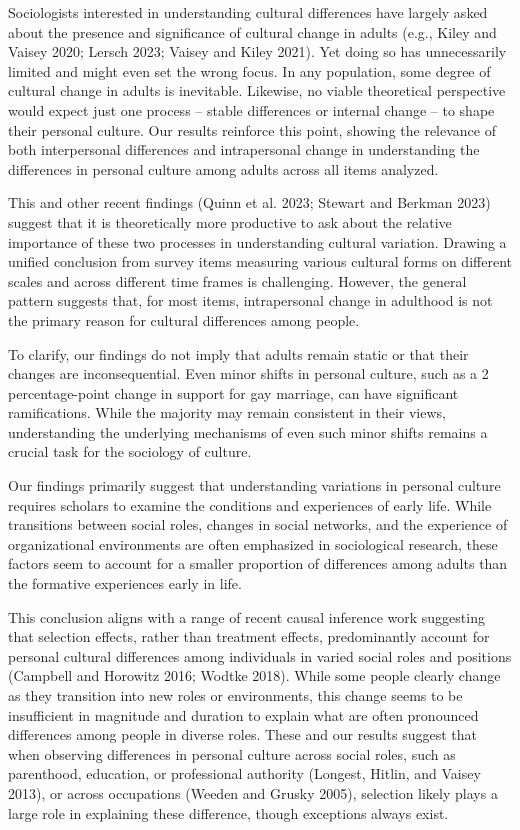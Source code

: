 \documentclass[
  12pt,
]{article}
\begin{document}
Sociologists interested in understanding cultural differences have
largely asked about the presence and significance of cultural change in
adults (e.g., Kiley and Vaisey 2020; Lersch 2023; Vaisey and Kiley
2021). Yet doing so has unnecessarily limited and might even set the
wrong focus. In any population, some degree of cultural change in adults
is inevitable. Likewise, no viable theoretical perspective would expect
just one process -- stable differences or internal change -- to shape
their personal culture. Our results reinforce this point, showing the
relevance of both interpersonal differences and intrapersonal change in
understanding the differences in personal culture among adults across
all items analyzed.

This and other recent findings (Quinn et al. 2023; Stewart and Berkman
2023) suggest that it is theoretically more productive to ask about the
relative importance of these two processes in understanding cultural
variation. Drawing a unified conclusion from survey items measuring
various cultural forms on different scales and across different time
frames is challenging. However, the general pattern suggests that, for
most items, intrapersonal change in adulthood is not the primary reason
for cultural differences among people.

To clarify, our findings do not imply that adults remain static or that
their changes are inconsequential. Even minor shifts in personal
culture, such as a 2 percentage-point change in support for gay
marriage, can have significant ramifications. While the majority may
remain consistent in their views, understanding the underlying
mechanisms of even such minor shifts remains a crucial task for the
sociology of culture.

Our findings primarily suggest that understanding variations in personal
culture requires scholars to examine the conditions and experiences of
early life. While transitions between social roles, changes in social
networks, and the experience of organizational environments are often
emphasized in sociological research, these factors seem to account for a
smaller proportion of differences among adults than the formative
experiences early in life.

This conclusion aligns with a range of recent causal inference work
suggesting that selection effects, rather than treatment effects,
predominantly account for personal cultural differences among
individuals in varied social roles and positions (Campbell and Horowitz
2016; Wodtke 2018). While some people clearly change as they transition
into new roles or environments, this change seems to be insufficient in
magnitude and duration to explain what are often pronounced differences
among people in diverse roles. These and our results suggest that when
observing differences in personal culture across social roles, such as
parenthood, education, or professional authority (Longest, Hitlin, and
Vaisey 2013), or across occupations (Weeden and Grusky 2005), selection
likely plays a large role in explaining these difference, though
exceptions always exist.
\end{document}

